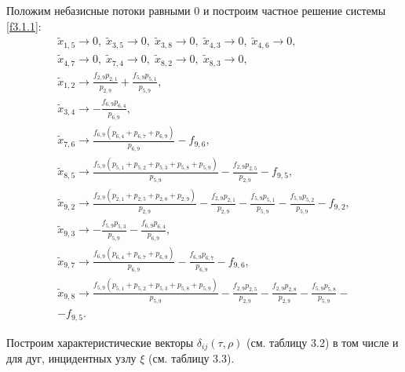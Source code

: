 \documentclass[14pt]{extarticle}%
\begin{document}
Положим небазисные потоки равными 0 и построим частное решение системы \eqref{f3.1.1}:
\begin{equation}
\begin{gathered}
\tilde{x}_{1,5}\to 0,\;
\tilde{x}_{3,5}\to 0,\;
\tilde{x}_{3,8}\to 0,\;
\tilde{x}_{4,3}\to 0,\;
\tilde{x}_{4,6}\to 0,\\
\tilde{x}_{4,7}\to 0,\;
\tilde{x}_{7,4}\to 0,\;
\tilde{x}_{8,2}\to 0,\;
\tilde{x}_{8,3}\to 0,\\
\tilde{x}_{1,2}\to \frac{f_{2,9} p_{2,1}}{p_{2,9}}+\frac{f_{5,9} p_{5,1}}{p_{5,9}},\\
\tilde{x}_{3,4}\to -\frac{f_{6,9} p_{6,4}}{p_{6,9}},\\
\tilde{x}_{7,6}\to \frac{f_{6,9} \left(p_{6,4}+p_{6,7}+p_{6,9}\right)}{p_{6,9}}-f_{9,6},\\
\tilde{x}_{8,5}\to \frac{f_{5,9} \left(p_{5,1}+p_{5,2}+p_{5,3}+p_{5,8}+p_{5,9}\right)}{p_{5,9}}-\frac{f_{2,9} p_{2,5}}{p_{2,9}}-f_{9,5},\\
\tilde{x}_{9,2}\to \frac{f_{2,9} \left(p_{2,1}+p_{2,5}+p_{2,8}+p_{2,9}\right)}{p_{2,9}}-\frac{f_{2,9} p_{2,1}}{p_{2,9}}-\frac{f_{5,9} p_{5,1}}{p_{5,9}}-\frac{f_{5,9} p_{5,2}}{p_{5,9}}-f_{9,2},\\
\tilde{x}_{9,3}\to -\frac{f_{5,9} p_{5,3}}{p_{5,9}}-\frac{f_{6,9} p_{6,4}}{p_{6,9}},\\
\tilde{x}_{9,7}\to \frac{f_{6,9} \left(p_{6,4}+p_{6,7}+p_{6,9}\right)}{p_{6,9}}-\frac{f_{6,9} p_{6,7}}{p_{6,9}}-f_{9,6},\\
\tilde{x}_{9,8}\to \frac{f_{5,9} \left(p_{5,1}+p_{5,2}+p_{5,3}+p_{5,8}+p_{5,9}\right)}{p_{5,9}}-\frac{f_{2,9} p_{2,5}}{p_{2,9}}-\frac{f_{2,9} p_{2,8}}{p_{2,9}}-\frac{f_{5,9} p_{5,8}}{p_{5,9}}-\\-f_{9,5}.
\end{gathered}
\end{equation}

Построим характеристические векторы $\delta_{ij}(\tau,\rho)$ (см. таблицу 3.2) в том числе и для дуг, инцидентных узлу $\xi$ (см. таблицу 3.3).
\end{document}
